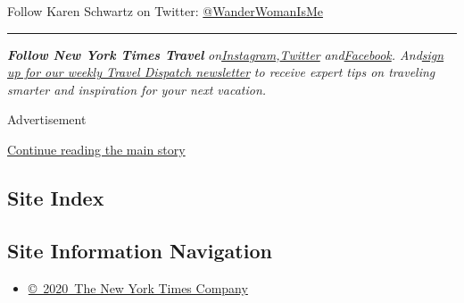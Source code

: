 Follow Karen Schwartz on Twitter:
\href{https://twitter.com/wanderwomanisme?lang=en}{@WanderWomanIsMe}

\begin{center}\rule{0.5\linewidth}{\linethickness}\end{center}

\emph{\textbf{Follow New York Times Travel}}
\emph{on}\href{https://www.instagram.com/nytimestravel/}{\emph{Instagram}}\emph{,}\href{https://twitter.com/nytimestravel}{\emph{Twitter}}
\emph{and}\href{https://www.facebookcorewwwi.onion/nytimestravel/}{\emph{Facebook}}\emph{.
And}\href{https://www.nytimes3xbfgragh.onion/newsletters/traveldispatch}{\emph{sign
up for our weekly Travel Dispatch newsletter}} \emph{to receive expert
tips on traveling smarter and inspiration for your next vacation.}

Advertisement

\protect\hyperlink{after-bottom}{Continue reading the main story}

\hypertarget{site-index}{%
\subsection{Site Index}\label{site-index}}

\hypertarget{site-information-navigation}{%
\subsection{Site Information
Navigation}\label{site-information-navigation}}

\begin{itemize}
\tightlist
\item
  \href{https://help.nytimes3xbfgragh.onion/hc/en-us/articles/115014792127-Copyright-notice}{©~2020~The
  New York Times Company}
\end{itemize}

